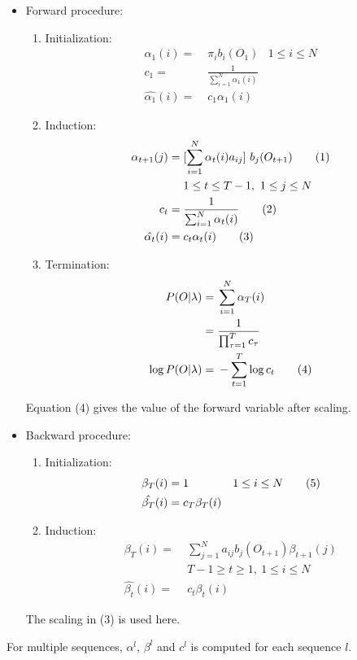 \documentclass[letterpaper, 10 pt, conference]{ieeeconf}  %
\newcommand\numberthis{\addtocounter{equation}{1}\tag{\theequation}}
\begin{document}
\begin{itemize} 
\item Forward procedure:
\begin{enumerate}
	\item Initialization:
	\begin{align*}
	\alpha_1(i) =&\; \pi_i b_i(O_1) & 1 \leq i \leq N \\
	c_1 =&\; \frac{1}{\sum_{i=1}^N \alpha_1(i)}  \\
	\hat{\alpha_1}(i) =&\; c_1 \alpha_1(i) 
	\end{align*}
	
	\item Induction:
	\begin{align*}
	\alpha_{t+1}(j) =&\; [ \sum_{i=1}^N \alpha_t(i) a_{ij} ] \ b_j(O_{t+1})\numberthis  \\
	&\; 1 \leq t \leq T-1, \ 1\leq j \leq N \\
	c_t =&\; \frac{1}{\sum_{i=1}^N \alpha_t(i)} \numberthis \\
	\hat{\alpha_t}(i) =&\; c_t \alpha_t(i) \numberthis
	\end{align*}

	\item Termination:
	\begin{align*}
	P(O|\lambda) =&\; \sum_{i=1}^N \alpha_T(i)  \\
	=&\; \frac{1}{\prod_{\tau=1}^T c_{\tau}} \\ 
	\log{P(O|\lambda)} =&\;  -\sum_{t=1}^T \log{c_t}  \numberthis \\
	\end{align*}
\end{enumerate}
Equation (4) gives the value of the forward variable after scaling.

\item Backward procedure:
\begin{enumerate}
	\item Initialization:
	\begin{align*}
	\beta_T(i) =&\; 1  & 1 \leq i \leq N \numberthis \\
	\hat{\beta_T}(i) =&\; c_T \beta_T(i)
	\end{align*}

	\item Induction:
	\begin{align*}
	\beta_T(i) =&\; \sum_{j=1}^N a_{ij} b_j(O_{t+1}) \beta_{t+1}(j) \\
	&\; T-1 \geq t \geq 1, \ 1 \leq i \leq N \\
	\hat{\beta_t}(i) =&\; c_t \beta_t(i)	
	\end{align*}

\end{enumerate}
The scaling in (3) is used here.
\end{itemize} 
For multiple sequences, $\alpha^l$, $\beta^l$ and $c^l$ is computed for each sequence $l$. \\
\end{document}
